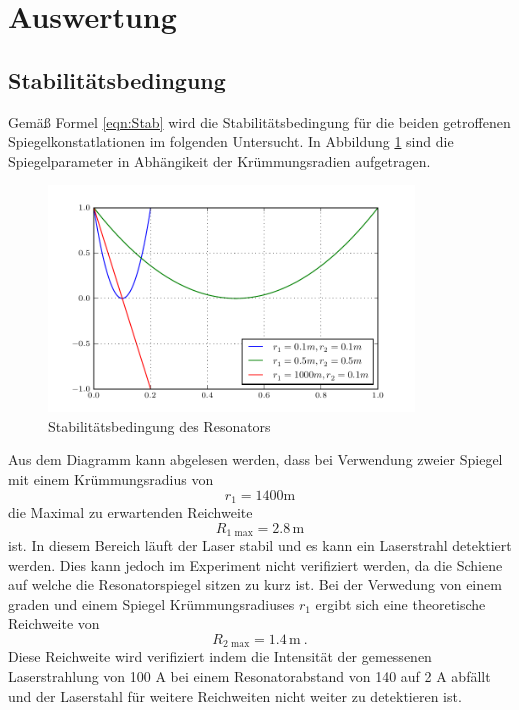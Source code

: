 \section{Auswertung}
\label{sec:Auswertung}

\subsection{Stabilitätsbedingung}
Gemäß Formel \ref{eqn:Stab} wird die Stabilitätsbedingung für die beiden getroffenen Spiegelkonstatlationen im folgenden Untersucht. In Abbildung \ref{fig:stabi} sind die Spiegelparameter in Abhängikeit der Krümmungsradien aufgetragen. 
\begin{figure}
  \centering
  \includegraphics[height=6cm]{Stabilisationsparameter.pdf} 
  \caption{Stabilitätsbedingung des Resonators}
  \label{fig:stabi}
\end{figure}
Aus dem Diagramm kann abgelesen werden, dass bei Verwendung zweier Spiegel mit einem Krümmungsradius von 
\begin{equation}
  r_1 = 1400 \text{m}
  \label{eqn:rad1}
\end{equation}
die Maximal zu erwartenden Reichweite
\begin{equation}
  R_\text{1 max} = 2.8 \, \text{m}
  \label{eqn:rmax1}
\end{equation}
ist. In diesem Bereich läuft der Laser stabil und es kann ein Laserstrahl detektiert werden. Dies kann jedoch im Experiment nicht verifiziert werden, da die Schiene auf welche die Resonatorspiegel sitzen zu kurz ist. Bei der Verwedung von einem graden und einem Spiegel Krümmungsradiuses $r_1$ ergibt sich eine theoretische Reichweite von
\begin{equation}
  R_\text{2 max} = 1.4 \, \text{m} \ .
  \label{eqn:rmax2}
\end{equation}
Diese Reichweite wird verifiziert indem die Intensität der gemessenen Laserstrahlung von 100 \mu A bei einem Resonatorabstand von 140 auf 2 \mu A abfällt und der Laserstahl für weitere Reichweiten nicht weiter zu detektieren ist.

